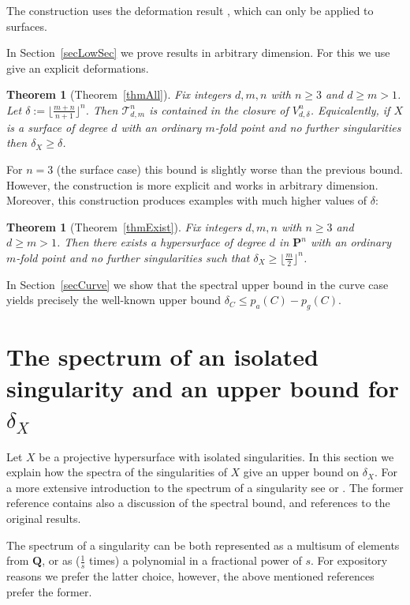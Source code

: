\documentclass{amsart}
\newcommand{\Ps}{\mathbf{P}}
\newcommand{\Q}{\mathbf{Q}}
\newtheorem{theorem}[lemma]{Theorem}
\theoremstyle{definition}
\theoremstyle{remark}
\begin{document}
The construction uses the deformation result \cite[Theorem 3.3]{CiGa26}, which can only be applied to surfaces.

In Section~\ref{secLowSec} we prove results in arbitrary dimension. For this we use give an explicit deformations.

\begin{theorem}[Theorem~\ref{thmAll}] Fix integers $d,m,n$ with $n\geq 3$ and  $d\geq m>1$. Let $\delta:= \lfloor\frac{m+n}{n+1}\rfloor^n$.
 Then $\mathcal{T}^n_{d,m}$ is contained in the closure of $V^n_{d,\delta}$. 
Equicalently, if $X$ is a surface of degree $d$ with an ordinary $m$-fold point and no further singularities then $\delta_X\geq \delta$.
\end{theorem}

For $n=3$ (the surface case) this bound is slightly worse than the previous bound. However, the construction is more explicit and works in arbitrary dimension. Moreover, this construction produces examples with much higher values of $\delta$:

\begin{theorem}[Theorem~\ref{thmExist}] Fix integers $d,m,n$ with $n\geq 3$ and  $d\geq m>1$. Then there exists a hypersurface of degree $d$ in $\Ps^n$ with an ordinary $m$-fold point and no further singularities such that  $\delta_{X}\geq  \lfloor \frac{m}{2}\rfloor ^n$.
\end{theorem}


In Section~\ref{secCurve} we show that the spectral upper bound in the curve case yields precisely the well-known upper bound $\delta_C\leq p_a(C)-p_g(C)$.

\section{The spectrum of an isolated singularity and an upper bound for $\delta_X$}\label{secUpper}
Let $X$ be a projective hypersurface with isolated singularities. 
In this section we  explain how the spectra of the singularities of $X$ give an upper bound on $\delta_X$.
For a more extensive introduction to the spectrum of a singularity see \cite{DucoNotes} or \cite[Section II.8]{Kuli}. The former reference contains also a discussion of the spectral bound, and references to the original results.

The spectrum of a singularity can be both represented as a multisum of elements from $\Q$, or as ($\frac{1}{s}$ times) a polynomial in a fractional power of $s$. For expository reasons we prefer the latter choice, however, the above mentioned references prefer the former.
\end{document}
